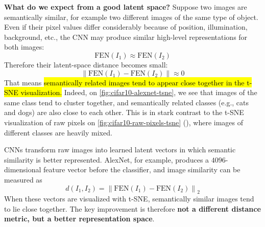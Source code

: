 \noindent
\textcolor{Green3}{ \textbf{What do we expect from a good latent space?}} Suppose two images are semantically similar, for example two different images of the same type of object. Even if their pixel values differ considerably because of position, illumination, background, etc., the CNN may produce similar high-level representations for both images:
\begin{equation*}
    \mathrm{FEN}\left(I_1\right) \approx \mathrm{FEN}\left(I_2\right)
\end{equation*}
Therefore their latent-space distance becomes small:
\begin{equation*}
    \left\| \mathrm{FEN}\left(I_1\right) - \mathrm{FEN}\left(I_2\right) \right\| \approx 0
\end{equation*}
That means \hl{semantically related images tend to appear close together in the t-SNE visualization.} Indeed, on \autoref{fig:cifar10-alexnet-tsne}, we see that images of the same class tend to cluster together, and semantically related classes (e.g., cats and dogs) are also close to each other. This is in stark contrast to the t-SNE visualization of raw pixels on \autoref{fig:cifar10-raw-pixels-tsne} (), where images of different classes are heavily mixed.

\highspace
\begin{takeawaysbox}
    CNNs transform raw images into learned latent vectors in which semantic similarity is better represented. AlexNet, for example, produces a $4096$-dimensional feature vector before the classifier, and image similarity can be measured as
    \begin{equation*}
        d\left(I_1,I_2\right)=\left\|\mathrm{FEN}\left(I_1\right)-\mathrm{FEN}\left(I_2\right)\right\|_{2}
    \end{equation*}
    When these vectors are visualized with t-SNE, semantically similar images tend to lie close together. The key improvement is therefore \textbf{not a different distance metric, but a better representation space}.
\end{takeawaysbox}